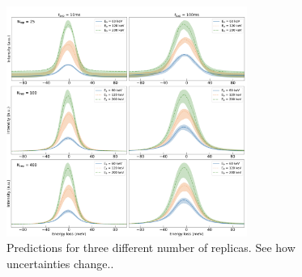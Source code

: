 \begin{figure}[h]
\centering
 \includegraphics[width=0.7\textwidth]{plots/Prediction_120keV_different_nrep.pdf}
 \caption{Predictions for three different number of replicas. See how uncertainties change..}
    \label{fig:EELS_vacuum_DeltaE_check3}
\end{figure}




